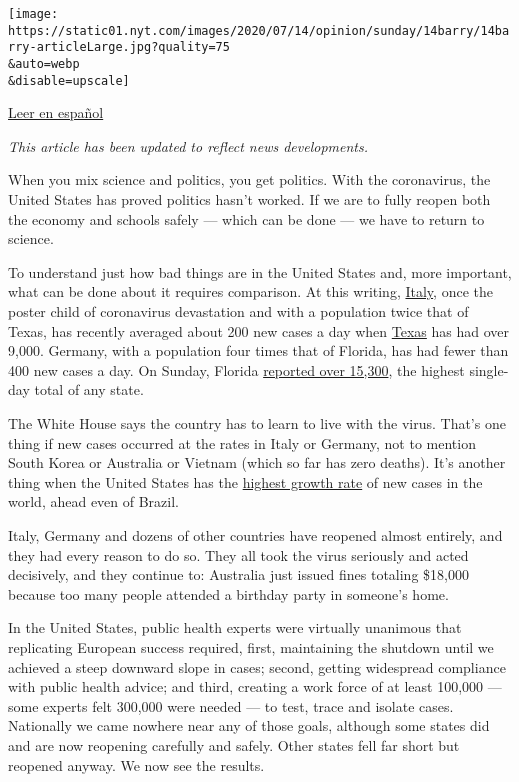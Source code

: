 \texttt{[image: https://static01.nyt.com/images/2020/07/14/opinion/sunday/14barry/14barry-articleLarge.jpg?quality=75\\\&auto=webp\\\&disable=upscale]}

\href{https://www.nytimes.com/es/2020/07/16/espanol/opinion/coronavirus-cuarentena.html}{Leer
en español}

\emph{This article has been updated to reflect news developments.}

When you mix science and politics, you get politics. With the
coronavirus, the United States has proved politics hasn't worked. If we
are to fully reopen both the economy and schools safely --- which can be
done --- we have to return to science.

To understand just how bad things are in the United States and, more
important, what can be done about it requires comparison. At this
writing,
\href{https://www.nytimes.com/interactive/2020/world/coronavirus-maps.html}{Italy},
once the poster child of coronavirus devastation and with a population
twice that of Texas, has recently averaged about 200 new cases a day
when
\href{https://www.nytimes.com/interactive/2020/us/texas-coronavirus-cases.html}{Texas}
has had over 9,000. Germany, with a population four times that of
Florida, has had fewer than 400 new cases a day. On Sunday, Florida
\href{https://www.nytimes.com/2020/07/12/us/florida-coronavirus-covid-cases.html}{reported
over 15,300}, the highest single-day total of any state.

The White House says the country has to learn to live with the virus.
That's one thing if new cases occurred at the rates in Italy or Germany,
not to mention South Korea or Australia or Vietnam (which so far has
zero deaths). It's another thing when the United States has the
\href{https://coronavirus.jhu.edu/data/new-cases}{highest growth rate}
of new cases in the world, ahead even of Brazil.

Italy, Germany and dozens of other countries have reopened almost
entirely, and they had every reason to do so. They all took the virus
seriously and acted decisively, and they continue to: Australia just
issued fines totaling \$18,000 because too many people attended a
birthday party in someone's home.

In the United States, public health experts were virtually unanimous
that replicating European success required, first, maintaining the
shutdown until we achieved a steep downward slope in cases; second,
getting widespread compliance with public health advice; and third,
creating a work force of at least 100,000 --- some experts felt 300,000
were needed --- to test, trace and isolate cases. Nationally we came
nowhere near any of those goals, although some states did and are now
reopening carefully and safely. Other states fell far short but reopened
anyway. We now see the results.

